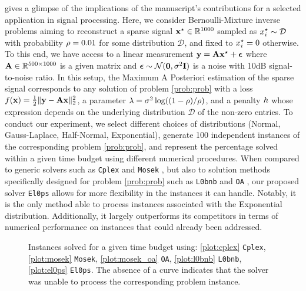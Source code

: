 \documentclass[11pt]{article}
\begin{document}
 gives a glimpse of the implications of the manuscript's contributions for a selected application in signal processing.
Here, we consider Bernoulli-Mixture inverse problems \cite{soussen2011bernoulli} aiming to reconstruct a sparse signal $\groundtruth \in \kR^{1000}$ sampled as $x_{i}^{\star} \sim \mathcal{D}$ with probability $\rho = 0.01$ for some distribution $\mathcal{D}$, and fixed to $x_{i}^{\star}=0$ otherwise. 
To this end, we have access to a linear measurement $\mathbf{y} = \mathbf{A}\mathbf{x}^{\star} + \boldsymbol{\epsilon}$ where $\dic \in \kR^{500 \times 1000}$ is a given matrix and $\boldsymbol{\epsilon} \sim \mathcal{N}(\mathbf{0},\sigma^2 \mathbf{I})$ is a noise with 10dB signal-to-noise ratio.
In this setup, the Maximum A Posteriori estimation of the sparse signal corresponds to any solution of problem \eqref{prob:prob} with
a loss $f(\mathbf{x}) = \frac{1}{2}\|\mathbf{y} - \mathbf{A}\mathbf{x}\|_2^2$,
a parameter $\lambda = \sigma^2\log((1-\rho)/\rho)$,
and a penalty $h$ whose expression depends on the underlying distribution $\mathcal{D}$ of the non-zero entries.
To conduct our experiment, we select different choices of distributions (Normal, Gauss-Laplace, Half-Normal, Exponential), generate 100 independent instances of the corresponding problem \eqref{prob:prob}, and represent the percentage solved within a given time budget using different numerical procedures.
When compared to generic solvers such as \texttt{Cplex} and \texttt{Mosek} \cite{kronqvist2019review}, but also to solution methods specifically designed for problem \eqref{prob:prob} such as \texttt{L0bnb} \cite{hazimeh2022sparse} and \texttt{OA} \cite{bertsimas2021unified}, our proposed solver \texttt{El0ps} allows for more flexibility in the instances it can handle.
Notably, it is the only method able to process instances associated with the Exponential distribution.
Additionally, it largely outperforms its competitors in terms of numerical performance on instances that could already been addressed.


\begin{figure}[!ht]
    \vspace*{-0.3cm}
    \centering
    
    \vspace*{-0.75cm}
    \caption{Instances solved for a given time budget using: \ref{plot:cplex} \texttt{Cplex}, \ref{plot:mosek} \texttt{Mosek}, \ref{plot:mosek_oa} \texttt{OA}, \ref{plot:l0bnb} \texttt{L0bnb}, \ref{plot:el0ps} \texttt{El0ps}. The absence of a curve indicates that the solver was unable to process the corresponding problem instance.}
    \label{fig:perfprofiles}
    \vspace*{-0.4cm}
\end{figure}


{
    \small
    
}
\end{document}
